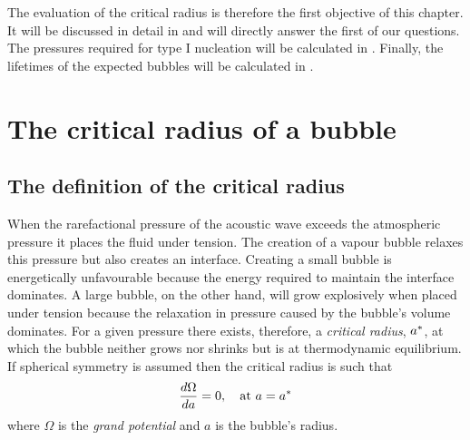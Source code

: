 
The evaluation of the critical radius is therefore the first objective of this chapter.
It will be discussed in detail in  and will directly answer the first of our questions.
The pressures required for type I nucleation will be calculated in .
Finally, the lifetimes of the expected bubbles will be calculated in .

\section{The critical radius of a bubble} \label{sec:nuc:radius}

\subsection{The definition of the critical radius}



When the rarefactional pressure of the acoustic wave exceeds the atmospheric pressure it places the fluid under tension.
The creation of a vapour bubble  relaxes this pressure but  also creates an interface.
Creating a small bubble is energetically unfavourable because the energy required to maintain the interface dominates.
A large bubble, on the other hand, will grow explosively when placed under tension because the relaxation in pressure caused by the bubble's volume dominates.
For a given pressure there exists, therefore, a {\em critical radius}, ${a^\ast}$, at which the bubble neither grows nor shrinks 
but is at thermodynamic equilibrium.
If  spherical symmetry is assumed then 
the critical radius is such that\cite{Oxtoby1992,Oxtoby1988}
\begin{align}
  \frac{d \Omega}{d a} =0,\quad\text{at $a = {a^\ast}$} \label{eqn:nuc:astarR}
\end{align}
where $\Omega$ is the {\em grand potential} and $a$ is the bubble's radius.

